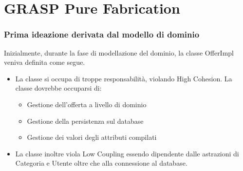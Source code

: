 \section{GRASP Pure Fabrication}

\begin{frame}
    \frametitle{Prima ideazione derivata dal modello di dominio}
    Inizialmente, durante la fase di modellazione del dominio, la classe OfferImpl veniva definita come segue.

    \begin{minipage}{.29\textwidth}
        \begin{figure}
            \centering
        \end{figure}
    \end{minipage}
    \begin{minipage}{.68\textwidth}
        \begin{itemize}
            \item<1-> La classe si occupa di troppe responsabilità, violando High Cohesion. La classe dovrebbe occuparsi di:
            \begin{itemize}
                \item Gestione dell'offerta a livello di dominio
                \item Gestione della persistenza sul database
                \item Gestione dei valori degli attributi compilati
            \end{itemize}
            \item<2-> La classe inoltre viola Low Coupling essendo dipendente dalle astrazioni di Categoria e Utente oltre che alla connessione al database.
        \end{itemize}
    \end{minipage}
\end{frame}
